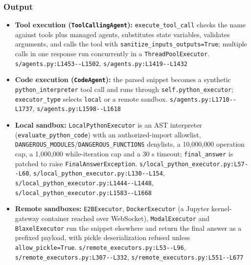 \subsubsection*{Output}
\begin{itemize}
\item \textbf{Tool execution (\texttt{ToolCallingAgent}):} \texttt{execute\_\allowbreak{}tool\_\allowbreak{}call} checks the name against tools plus managed agents, substitutes state variables, validates arguments, and calls the tool with \texttt{sanitize\_\allowbreak{}inputs\_\allowbreak{}outputs=True}; multiple calls in one response run concurrently in a \texttt{ThreadPoolExecutor}. \texttt{s/\allowbreak{}agents.\allowbreak{}py:\allowbreak{}L1453-\allowbreak{}-\allowbreak{}L1502}, \texttt{s/\allowbreak{}agents.\allowbreak{}py:\allowbreak{}L1419-\allowbreak{}-\allowbreak{}L1432}
\item \textbf{Code execution (\texttt{CodeAgent}):} the parsed snippet becomes a synthetic \texttt{python\_\allowbreak{}interpreter} tool call and runs through \texttt{self.\allowbreak{}python\_\allowbreak{}executor}; \texttt{executor\_\allowbreak{}type} selects \texttt{local} or a remote sandbox. \texttt{s/\allowbreak{}agents.\allowbreak{}py:\allowbreak{}L1710-\allowbreak{}-\allowbreak{}L1737}, \texttt{s/\allowbreak{}agents.\allowbreak{}py:\allowbreak{}L1598-\allowbreak{}-\allowbreak{}L1618}
\item \textbf{Local sandbox:} \texttt{LocalPythonExecutor} is an AST interpreter (\texttt{evaluate\_\allowbreak{}python\_\allowbreak{}code}) with an authorized-import allowlist, \texttt{DANGEROUS\_\allowbreak{}MODULES}/\texttt{DANGEROUS\_\allowbreak{}FUNCTIONS} denylists, a 10,000,000 operation cap, a 1,000,000 while-iteration cap and a 30 s timeout; \texttt{final\_\allowbreak{}answer} is patched to raise \texttt{FinalAnswerException}. \texttt{s/\allowbreak{}local\_\allowbreak{}python\_\allowbreak{}executor.\allowbreak{}py:\allowbreak{}L57-\allowbreak{}-\allowbreak{}L60}, \texttt{s/\allowbreak{}local\_\allowbreak{}python\_\allowbreak{}executor.\allowbreak{}py:\allowbreak{}L130-\allowbreak{}-\allowbreak{}L154}, \texttt{s/\allowbreak{}local\_\allowbreak{}python\_\allowbreak{}executor.\allowbreak{}py:\allowbreak{}L1444-\allowbreak{}-\allowbreak{}L1448}, \texttt{s/\allowbreak{}local\_\allowbreak{}python\_\allowbreak{}executor.\allowbreak{}py:\allowbreak{}L1583-\allowbreak{}-\allowbreak{}L1668}
\item \textbf{Remote sandboxes:} \texttt{E2BExecutor}, \texttt{DockerExecutor} (a Jupyter kernel-gateway container reached over WebSocket), \texttt{ModalExecutor} and \texttt{BlaxelExecutor} run the snippet elsewhere and return the final answer as a prefixed payload, with pickle deserialization refused unless \texttt{allow\_\allowbreak{}pickle=True}. \texttt{s/\allowbreak{}remote\_\allowbreak{}executors.\allowbreak{}py:\allowbreak{}L53-\allowbreak{}-\allowbreak{}L96}, \texttt{s/\allowbreak{}remote\_\allowbreak{}executors.\allowbreak{}py:\allowbreak{}L307-\allowbreak{}-\allowbreak{}L332}, \texttt{s/\allowbreak{}remote\_\allowbreak{}executors.\allowbreak{}py:\allowbreak{}L551-\allowbreak{}-\allowbreak{}L677}

\end{itemize}

